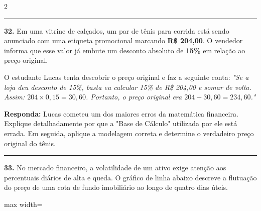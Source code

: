 \documentclass[twoside, 10pt, a4paper]{article}
\newlength{\espacoPreQuestao}
\newlength{\espacoQuestao}
\begin{document}
\begin{multicols*}{2}
\noindent\textcolor{CorLinha}{\rule{\linewidth}{0.5pt}} 
\par\vspace{\espacoPreQuestao}
\textbf{32.} Em uma vitrine de calçados, um par de tênis para corrida está sendo anunciado com uma etiqueta promocional marcando \textbf{R\$ 204,00}. O vendedor informa que esse valor já embute um desconto absoluto de \textbf{15\%} em relação ao preço original. 

O estudante Lucas tenta descobrir o preço original e faz a seguinte conta: \textit{"Se a loja deu desconto de 15\%, basta eu calcular 15\% de R\$ 204,00 e somar de volta. Assim: $ 204 \times 0,15 = 30,60 $. Portanto, o preço original era $ 204 + 30,60 = 234,60 $."}
\begin{boxresponda}
\textbf{Responda:} Lucas cometeu um dos maiores erros da matemática financeira. Explique detalhadamente por que a "Base de Cálculo" utilizada por ele está errada. Em seguida, aplique a modelagem correta e determine o verdadeiro preço original do tênis.
\end{boxresponda}
\par\vspace{\espacoQuestao}

\noindent\textcolor{CorLinha}{\rule{\linewidth}{0.5pt}} 
\par\vspace{\espacoPreQuestao}
\textbf{33.} No mercado financeiro, a volatilidade de um ativo exige atenção aos percentuais diários de alta e queda. O gráfico de linha abaixo descreve a flutuação do preço de uma cota de fundo imobiliário ao longo de quatro dias úteis.

\begin{center}
\begin{adjustbox}{max width=\linewidth}
\end{adjustbox}
\end{center}
\end{multicols*}
\end{document}

